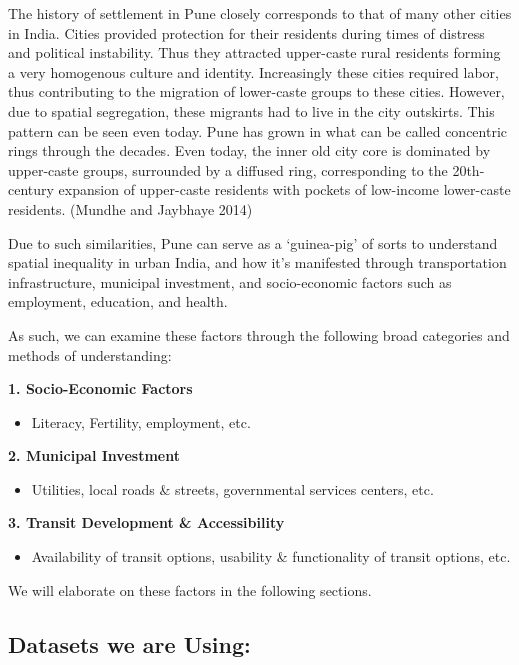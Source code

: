 \documentclass[
]{article}
\providecommand{\tightlist}{%
  \setlength{\itemsep}{0pt}\setlength{\parskip}{0pt}}
\begin{document}
The history of settlement in Pune closely corresponds to that of many
other cities in India. Cities provided protection for their residents
during times of distress and political instability. Thus they attracted
upper-caste rural residents forming a very homogenous culture and
identity. Increasingly these cities required labor, thus contributing to
the migration of lower-caste groups to these cities. However, due to
spatial segregation, these migrants had to live in the city outskirts.
This pattern can be seen even today. Pune has grown in what can be
called concentric rings through the decades. Even today, the inner old
city core is dominated by upper-caste groups, surrounded by a diffused
ring, corresponding to the 20th-century expansion of upper-caste
residents with pockets of low-income lower-caste residents. (Mundhe and
Jaybhaye 2014)

Due to such similarities, Pune can serve as a `guinea-pig' of sorts to
understand spatial inequality in urban India, and how it's manifested
through transportation infrastructure, municipal investment, and
socio-economic factors such as employment, education, and health.

As such, we can examine these factors through the following broad
categories and methods of understanding:

\textbf{1. Socio-Economic Factors}

\begin{itemize}
\tightlist
\item
  Literacy, Fertility, employment, etc.
\end{itemize}

\textbf{2. Municipal Investment}

\begin{itemize}
\tightlist
\item
  Utilities, local roads \& streets, governmental services centers, etc.
\end{itemize}

\textbf{3. Transit Development \& Accessibility}

\begin{itemize}
\tightlist
\item
  Availability of transit options, usability \& functionality of transit
  options, etc.
\end{itemize}

We will elaborate on these factors in the following sections.

\hypertarget{datasets-we-are-using}{%
\subsection{Datasets we are Using:}\label{datasets-we-are-using}}
\end{document}
